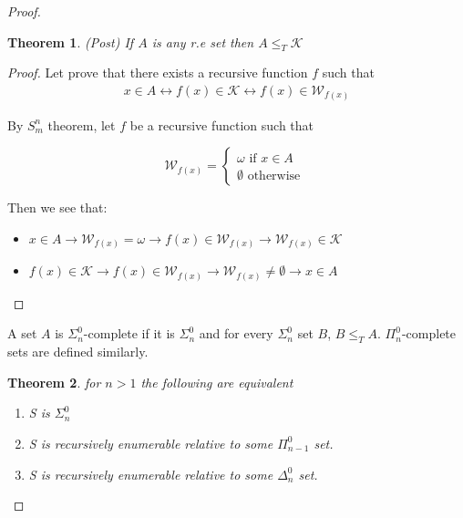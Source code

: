 \documentclass[a4paper,10pt]{article}
\newenvironment{definition}[1][Definition]{\begin{trivlist}
\item[\hskip \labelsep {\bfseries #1}]}{\end{trivlist}}
\newtheorem{theorem}{Theorem}[section]
\newcommand*\map{\rightarrow}
\newcommand*\biject{\leftrightarrow}
\newcommand*\halt{\mathcal{K}}
\newcommand*\partf{\mathcal{W}}
\begin{document}
\begin{proof}
    \begin{theorem} \label{enumerhalt}
     (Post) If $A$ is any r.e set then $A \leq_T \mathcal{K}$ 
    \end{theorem}
    
    \begin{proof}
     Let prove that there exists a recursive function $f$ such that 
     \begin{gather*}
      x \in A \biject f(x) \in \halt \biject f(x) \in \partf_{f(x)}
     \end{gather*}

     By $S_m^n$ theorem, let $f$ be a recursive function such that
     
     
     $$ \partf_{f(x)} = \begin{cases} \omega \text{ if $x \in A$} \\ \emptyset \text{ otherwise } \end{cases} $$
    
      Then we see that:
      \begin{itemize}
       \item $x \in A \map \partf_{f(x)} = \omega \map f(x) \in \partf_{f(x)} \map \partf_{f(x)} \in \halt$ 
       \item $f(x) \in \halt \map f(x) \in \partf_{f(x)} \map \partf_{f(x)} \neq \emptyset \map x \in A$
      \end{itemize}
    \end{proof}

    \begin{definition}
     A set $A$ is $\Sigma_n^0$-complete if it is $\Sigma_n^0$ and for every $\Sigma_n^0$ set $B$, $B \leq_T A$. $\Pi_n^0$-complete sets are defined similarly.
    \end{definition}


    

    \begin{theorem}
      for $n > 1$ the following are equivalent
      \begin{enumerate}
       \item S is $\Sigma_n^0$
       \item S is recursively enumerable relative to some $\Pi_{n-1}^0$ set.
       \item S is recursively enumerable relative to some $\Delta_n^0$ set.
      \end{enumerate}
     \end{theorem}
     

\end{proof}
\end{document}
